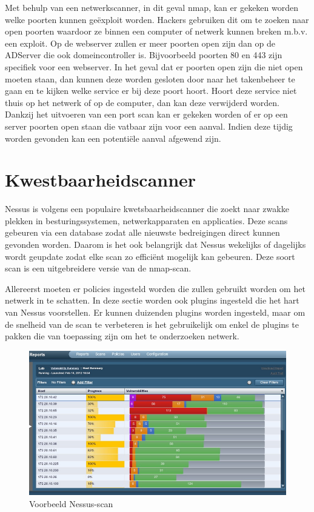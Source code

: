 \documentclass[pdftex,a4paper,12pt]{report}
\begin{document}
Met behulp van een netwerkscanner, in dit geval nmap, kan er gekeken worden welke poorten kunnen geëxploit worden. Hackers gebruiken dit om te zoeken naar open poorten waardoor ze binnen een computer of netwerk kunnen breken m.b.v. een exploit. Op de webserver zullen er meer poorten open zijn dan op de ADServer die ook domeincontroller is. Bijvoorbeeld poorten 80 en 443 zijn specifiek voor een webserver. In het geval dat er poorten open zijn die niet open moeten staan, dan kunnen deze worden gesloten door naar het takenbeheer te gaan en te kijken welke service er bij deze poort hoort. Hoort deze service niet thuis op het netwerk of op de computer, dan kan deze verwijderd worden. Dankzij het uitvoeren van een port scan kan er gekeken worden of er op een server poorten open staan die vatbaar zijn voor een aanval. Indien deze tijdig worden gevonden kan een potentiële aanval afgewend zijn.

\section{Kwestbaarheidscanner}
Nessus is volgens \cite{Jackson2010} een populaire kwetsbaarheidscanner die zoekt naar zwakke plekken in besturingssystemen, netwerkapparaten en applicaties. Deze scans gebeuren via een database zodat alle nieuwste bedreigingen direct kunnen gevonden worden. Daarom is het ook belangrijk dat Nessus wekelijks of dagelijks wordt geupdate zodat elke scan zo efficiënt mogelijk kan gebeuren. Deze soort scan is een uitgebreidere versie van de nmap-scan. \newline

Allereerst moeten er policies ingesteld worden die zullen gebruikt worden om het netwerk in te schatten. In deze sectie worden ook plugins ingesteld die het hart van Nessus voorstellen. Er kunnen duizenden plugins worden ingesteld, maar om de snelheid van de scan te verbeteren is het gebruikelijk om enkel de plugins te pakken die van toepassing zijn om het te onderzoeken netwerk. \newline

\begin{figure}[H]
\begin{center}
\includegraphics[scale=0.60]{img/Nessus1}
\end{center}
\caption{Voorbeeld Nessus-scan}
\end{figure}
\end{document}
